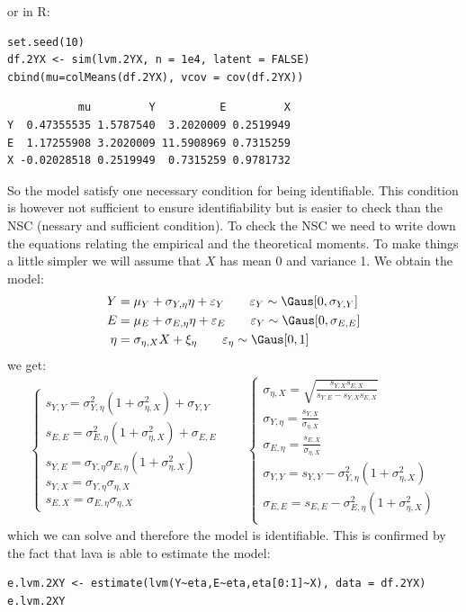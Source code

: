 \documentclass[12pt]{article}
\begin{document}
or in R:
\lstset{language=r,label= ,caption= ,captionpos=b,numbers=none}
\begin{lstlisting}
set.seed(10)
df.2YX <- sim(lvm.2YX, n = 1e4, latent = FALSE)
cbind(mu=colMeans(df.2YX), vcov = cov(df.2YX))
\end{lstlisting}

\begin{verbatim}
           mu         Y          E         X
Y  0.47355535 1.5787540  3.2020009 0.2519949
E  1.17255908 3.2020009 11.5908969 0.7315259
X -0.02028518 0.2519949  0.7315259 0.9781732
\end{verbatim}

So the model satisfy one necessary condition for being
identifiable. This condition is however not sufficient to ensure
identifiability but is easier to check than the NSC (nessary and
sufficient condition). To check the NSC we need to write down the
equations relating the empirical and the theoretical moments. To make
things a little simpler we will assume that \(X\) has mean 0 and
variance 1. We obtain the model:
\begin{align*}
Y &= \mu_Y + \sigma_{Y,\eta} \eta + \varepsilon_Y \qquad \varepsilon_Y\sim\Gaus[0,\sigma_{Y,Y}] \\
E &= \mu_E + \sigma_{E,\eta} \eta + \varepsilon_E \qquad \varepsilon_Y\sim\Gaus[0,\sigma_{E,E}]\\
\eta &= \sigma_{\eta,X} X + \xi_\eta \qquad \varepsilon_\eta\sim\Gaus[0,1]
\end{align*}
we get:
\begin{align*}
\left\{
\begin{array}{l}
s_{Y,Y} = \sigma_{Y,\eta}^2(1+\sigma^2_{\eta,X}) + \sigma_{Y,Y} \\
s_{E,E} = \sigma_{E,\eta}^2(1+\sigma^2_{\eta,X}) + \sigma_{E,E} \\
s_{Y,E} = \sigma_{Y,\eta}\sigma_{E,\eta}(1+\sigma^2_{\eta,X}) \\
s_{Y,X} = \sigma_{Y,\eta}\sigma_{\eta,X} \\
s_{E,X} = \sigma_{E,\eta}\sigma_{\eta,X} 
\end{array}
\right.
\qquad
\left\{
\begin{array}{l}
\sigma_{\eta,X} = \sqrt{\frac{s_{Y,X}s_{E,X}}{s_{Y,E}-s_{Y,X}s_{E,X}}} \\
\sigma_{Y,\eta} = \frac{s_{Y,X}}{\sigma_{\eta,X}} \\
\sigma_{E,\eta} = \frac{s_{E,X}}{\sigma_{\eta,X}} \\
\sigma_{Y,Y} = s_{Y,Y} - \sigma_{Y,\eta}^2(1+\sigma^2_{\eta,X}) \\
\sigma_{E,E} = s_{E,E} - \sigma_{E,\eta}^2(1+\sigma^2_{\eta,X}) \\
\end{array}
\right.
\end{align*}
which we can solve and therefore the model is identifiable. This is
confirmed by the fact that lava is able to estimate the model:
\lstset{language=r,label= ,caption= ,captionpos=b,numbers=none}
\begin{lstlisting}
e.lvm.2XY <- estimate(lvm(Y~eta,E~eta,eta[0:1]~X), data = df.2YX)
e.lvm.2XY
\end{lstlisting}
\end{document}
